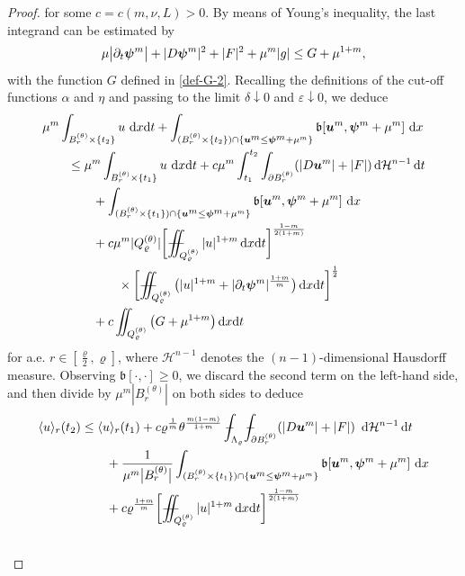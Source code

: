 \documentclass[a4paper, 10pt, american]{amsart}
\numberwithin{theorem}{section}
\numberwithin{equation}{section}
\newcommand{\mint}{- \mskip-19,5mu \int}
\newcommand{\dxdt}{\,\mathrm{d}x\mathrm{d}t}
\renewcommand{\d}{\,\mathrm{d}}
\newcommand{\dx}{\,\mathrm{d}x}
\newcommand{\dt}{\,\mathrm{d}t}
\newcommand{\eps}{\varepsilon}
\renewcommand{\rho}{\varrho}
\newcommand{\power}[2]{\bm{#1^{\mbox{\unboldmath{\scriptsize$#2$}}}}}
\def\Xiint#1{\mathchoice
    {\XXiint\displaystyle\textstyle{#1}}%
    {\XXiint\textstyle\scriptstyle{#1}}%
    {\XXiint\scriptstyle\scriptscriptstyle{#1}}%
    {\XXiint\scriptscriptstyle\scriptscriptstyle{#1}}%
    \!\iint}
\def\XXiint#1#2#3{\setbox0=\hbox{$#1{#2#3}{\iint}$}
    \vcenter{\hbox{$#2#3$}}\kern-0.5\wd0}
\def\biint{\Xiint{-\!-}}
\def\<{\langle}
\def\>{\rangle}
\begin{document}
\begin{proof}
for some $c=c(m,\nu,L)>0$.
By means of Young's inequality, the last integrand can be estimated
by
  \begin{equation*}
    \mu\big|\partial_t\power\psi m\big|+|D\power\psi m|^2 +
    |F|^2+\mu^m|g|
    \le
    G+\mu^{1+m},
  \end{equation*}
with the function $G$ defined in \eqref{def-G-2}.
Recalling the definitions of the cut-off
functions $\alpha$ and $\eta$ and passing to the limit
$\delta\downarrow0$ and $\eps\downarrow0$, we deduce
\begin{align}\label{pre-gluing-2}
  &\mu^m\int_{B_r^{(\theta)}\times\{t_2\}}u\,\dxdt
  +
  \int_{(B_r^{(\theta)}\times\{t_2\})\cap\{\power um \le \power \psi m+\mu^m\}}\mathfrak{b}[\power
  um,\power\psi m+\mu^m]\,\dx \nonumber\\\nonumber
  &\qquad\le
  \mu^m\int_{B_r^{(\theta)}\times\{t_1\}}u\,\dxdt
  +
  c\mu^m\int_{t_1}^{t_2}\int_{\partial B_r^{(\theta)}}(|D\power um| + |F|) \d\mathcal{H}^{n-1}\dt\\\nonumber
  &\qquad\qquad+
  \int_{(B_r^{(\theta)}\times\{t_1\})\cap\{\power um \le \power \psi m+\mu^m\}}\mathfrak{b}[\power
  um,\power\psi m+\mu^m]\,\dx\\\nonumber
  &\qquad\qquad
  +
 	c\mu^m|Q_\rho^{(\theta)}| \bigg[\biint_{Q_\rho^{(\theta)}} |u|^{1+m} \dxdt \bigg]^{\frac{1-m}{2(1+m)}}\\\nonumber
	&\qquad\qquad\qquad\times
	\bigg[\biint_{Q_\rho^{(\theta)}} \big( |u|^{1+m} + |\partial_t \power \psi {m}|^{\frac{1+m}m}\big) \dxdt\bigg]^{\frac{1}{2}}\\
	&\qquad\qquad
	+
	c\iint_{Q_\rho^{(\theta)}}\big(G+\mu^{1+m}
        \big) \dxdt 
\end{align}
for a.e. $r\in [\frac\rho2,\rho]$, where $\mathcal{H}^{n-1}$ denotes
the $(n-1)$-dimensional Hausdorff measure. 
Observing $\mathfrak{b}[\cdot,\cdot]\ge0$,
we discard the second term on the left-hand side, and then divide by $\mu^m|B_r^{(\theta)}|$ on both sides to deduce 
\begin{align}\label{u-(t_2-t_1)}\nonumber
  \<u\>_r(t_2)
  &\le
  \<u\>_r(t_1)
  +
  c\rho^{\frac1m}\theta^{\frac{m(1-m)}{1+m}}\mint_{\Lambda_\rho}\mint_{\partial
    B_r^{(\theta)}}(|D\power um| + |F|) \ \d\mathcal{H}^{n-1}\dt\\\nonumber
  &\qquad+
  \frac1{\mu^m\big|B_r^{(\theta)}\big|}\int_{(B_r^{(\theta)}\times\{t_1\})\cap\{\power um \le \power \psi m+\mu^m\}}\mathfrak{b}[\power
  um,\power\psi m+\mu^m]\,\dx\\\nonumber
  &\qquad
  +
   	c\rho^\frac{1+m}m \bigg[\biint_{Q_\rho^{(\theta)}} |u|^{1+m} \dxdt \bigg]^{\frac{1-m}{2(1+m)}}\\\nonumber

\end{align}
\end{proof}
\end{document}
